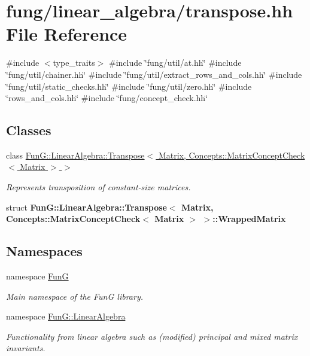 \hypertarget{transpose_8hh}{\section{fung/linear\-\_\-algebra/transpose.hh \-File \-Reference}
\label{transpose_8hh}
}
{\ttfamily \#include $<$type\-\_\-traits$>$}\*
{\ttfamily \#include \char`\"{}fung/util/at.\-hh\char`\"{}}\*
{\ttfamily \#include \char`\"{}fung/util/chainer.\-hh\char`\"{}}\*
{\ttfamily \#include \char`\"{}fung/util/extract\-\_\-rows\-\_\-and\-\_\-cols.\-hh\char`\"{}}\*
{\ttfamily \#include \char`\"{}fung/util/static\-\_\-checks.\-hh\char`\"{}}\*
{\ttfamily \#include \char`\"{}fung/util/zero.\-hh\char`\"{}}\*
{\ttfamily \#include \char`\"{}rows\-\_\-and\-\_\-cols.\-hh\char`\"{}}\*
{\ttfamily \#include \char`\"{}fung/concept\-\_\-check.\-hh\char`\"{}}\*
\subsection*{\-Classes}
\begin{DoxyCompactItemize}
\item 
class \hyperlink{classFunG_1_1LinearAlgebra_1_1Transpose_3_01Matrix_00_01Concepts_1_1MatrixConceptCheck_3_01Matrix_01_4_01_4}{\-Fun\-G\-::\-Linear\-Algebra\-::\-Transpose$<$ Matrix, Concepts\-::\-Matrix\-Concept\-Check$<$ Matrix $>$ $>$}
\begin{DoxyCompactList}\small\item\em \-Represents transposition of constant-\/size matrices. \end{DoxyCompactList}\item 
struct {\bfseries \-Fun\-G\-::\-Linear\-Algebra\-::\-Transpose$<$ Matrix, Concepts\-::\-Matrix\-Concept\-Check$<$ Matrix $>$ $>$\-::\-Wrapped\-Matrix}
\end{DoxyCompactItemize}
\subsection*{\-Namespaces}
\begin{DoxyCompactItemize}
\item 
namespace \hyperlink{namespaceFunG}{\-Fun\-G}
\begin{DoxyCompactList}\small\item\em \-Main namespace of the \-Fun\-G library. \end{DoxyCompactList}\item 
namespace \hyperlink{namespaceFunG_1_1LinearAlgebra}{\-Fun\-G\-::\-Linear\-Algebra}
\begin{DoxyCompactList}\small\item\em \-Functionality from linear algebra such as (modified) principal and mixed matrix invariants. \end{DoxyCompactList}\end{DoxyCompactItemize}

